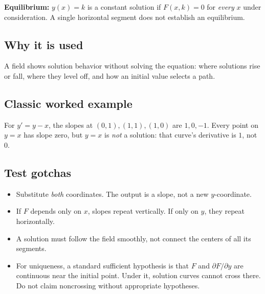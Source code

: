 \documentclass[11pt]{article}
\begin{document}
\textbf{Equilibrium:} $y(x)=k$ is a constant solution if $F(x,k)=0$ for \emph{every} $x$ under consideration. A single horizontal segment does not establish an equilibrium.

\subsection*{Why it is used}
A field shows solution behavior without solving the equation: where solutions rise or fall, where they level off, and how an initial value selects a path.

\subsection*{Classic worked example}
For $y'=y-x$, the slopes at $(0,1),(1,1),(1,0)$ are $1,0,-1$.
Every point on $y=x$ has slope zero, but $y=x$ is \emph{not} a solution: that curve's derivative is $1$, not $0$.
\begin{center}
\end{center}
\subsection*{Test gotchas}
\begin{itemize}
\item Substitute \emph{both} coordinates. The output is a slope, not a new $y$-coordinate.
\item If $F$ depends only on $x$, slopes repeat vertically. If only on $y$, they repeat horizontally.
\item A solution must follow the field smoothly, not connect the centers of all its segments.
\item For uniqueness, a standard sufficient hypothesis is that $F$ and $\partial F/\partial y$ are continuous near the initial point. Under it, solution curves cannot cross there. Do not claim noncrossing without appropriate hypotheses.
\end{itemize}
\end{document}
